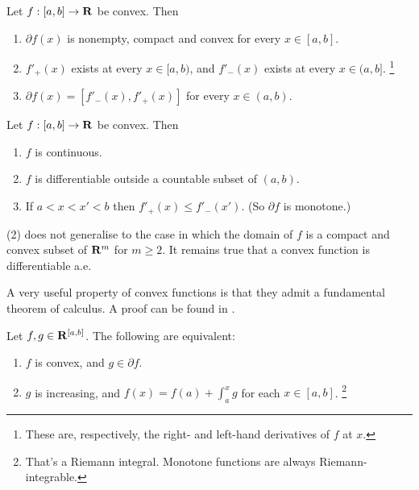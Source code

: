 \documentclass[11pt,letterpaper,reqno,oneside]{article}
\begin{document}
\begin{proposition}
	\label{proposition:convex_subgrad_1d}
	Let $f : [a,b] \to \mathbf{R}$ be convex. Then
	\begin{enumerate}

		\item $\partial f(x)$ is nonempty, compact and convex for every $x \in [a,b]$.

		\item $f'_+(x)$ exists at every $x \in [a,b)$, and $f'_-(x)$ exists at every $x \in (a,b]$.%
			\footnote{These are, respectively, the right- and left-hand derivatives of $f$ at $x$.}

		\item $\partial f(x) = \left[ f'_-(x), f'_+(x) \right]$ for every $x \in (a,b)$.

	\end{enumerate}
\end{proposition}


\begin{proposition}
	\label{proposition:convex_properties_1d}
	Let $f : [a,b] \to \mathbf{R}$ be convex. Then
	\begin{enumerate}

		\item $f$ is continuous.

		\item $f$ is differentiable outside a countable subset of $(a,b)$.

		\item If $a < x < x' < b$ then $f'_+(x) \leq f'_-(x')$. (So $\partial f$ is monotone.)

	\end{enumerate}
\end{proposition}

\begin{remark}
	(2) does not generalise to the case in which the domain of $f$ is a compact and convex subset of $\mathbf{R}^m$ for $m \geq 2$. It remains true that a convex function is differentiable a.e.
\end{remark}

A very useful property of convex functions is that they admit a fundamental theorem of calculus. A proof can be found in \textcite[][p. 232]{Rockafellar1970}.
%
\begin{theorem}
	\label{theorem:convex_FTC_1d}
	Let $f,g \in \mathbf{R}^{[a,b]}$. The following are equivalent:
	\begin{enumerate}

		\item $f$ is convex, and $g \in \partial f$.

		\item $g$ is increasing, and $f(x) = f(a) + \int_a^x g$ for each $x \in [a,b]$.%
			\footnote{That's a Riemann integral. Monotone functions are always Riemann-integrable.}

	\end{enumerate}
\end{theorem}
\end{document}
